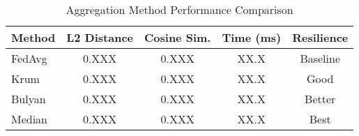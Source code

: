 
\begin{table}[htbp]
\centering
\caption{Aggregation Method Performance Comparison}
\label{tab:aggregation_comparison}
\begin{tabular}{lcccc}
\toprule
Method & L2 Distance & Cosine Sim. & Time (ms) & Resilience \\
\midrule
FedAvg & 0.XXX & 0.XXX & XX.X & Baseline \\
Krum & 0.XXX & 0.XXX & XX.X & Good \\
Bulyan & 0.XXX & 0.XXX & XX.X & Better \\
Median & 0.XXX & 0.XXX & XX.X & Best \\
\bottomrule
\end{tabular}
\end{table}
